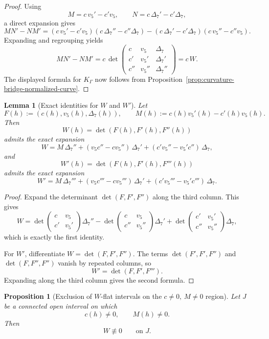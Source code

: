 \documentclass[11pt,a4paper]{amsart}
\theoremstyle{plain}
\newtheorem{proposition}[theorem]{Proposition}
\newtheorem{lemma}[theorem]{Lemma}
\theoremstyle{definition}
\begin{document}
\begin{proof}
Using
\[
M=c\,v_5'-c'v_5,
\qquad
N=c\,\Delta_7'-c'\Delta_7,
\]
a direct expansion gives
\[
M N'-N M'
=
(c\,v_5'-c'v_5)(c\,\Delta_7''-c''\Delta_7)
-
(c\,\Delta_7'-c'\Delta_7)(c\,v_5''-c''v_5).
\]
Expanding and regrouping yields
\[
M N'-N M'
=
c\,
\det\!
\begin{pmatrix}
c & v_5 & \Delta_7\\
c' & v_5' & \Delta_7'\\
c'' & v_5'' & \Delta_7''
\end{pmatrix}
=
c\,W.
\]
The displayed formula for $K_\Gamma$ now follows from
Proposition~\ref{prop:curvature-bridge-normalized-curve}.
\end{proof}

\begin{lemma}[Exact identities for $W$ and $W'$]
\label{lem:exact-W-and-Wprime-identities}
Let
\[
F(h):=(c(h),v_5(h),\Delta_7(h)),
\qquad
M(h):=c(h)v_5'(h)-c'(h)v_5(h).
\]
Then
\[
W(h)=\det(F(h),F'(h),F''(h))
\]
admits the exact expansion
\[
W
=
M\,\Delta_7''
+
(v_5c''-cv_5'')\,\Delta_7'
+
(c'v_5''-v_5'c'')\,\Delta_7,
\]
and
\[
W'(h)=\det(F(h),F'(h),F'''(h))
\]
admits the exact expansion
\[
W'
=
M\,\Delta_7'''
+
(v_5c'''-cv_5''')\,\Delta_7'
+
(c'v_5'''-v_5'c''')\,\Delta_7.
\]
\end{lemma}

\begin{proof}
Expand the determinant $\det(F,F',F'')$ along the third column. This gives
\[
W
=
\det\!\begin{pmatrix}
c & v_5\\ c' & v_5'
\end{pmatrix}\Delta_7''
-
\det\!\begin{pmatrix}
c & v_5\\ c'' & v_5''
\end{pmatrix}\Delta_7'
+
\det\!\begin{pmatrix}
c' & v_5'\\ c'' & v_5''
\end{pmatrix}\Delta_7,
\]
which is exactly the first identity.

For $W'$, differentiate $W=\det(F,F',F'')$. The terms
$\det(F',F',F'')$ and $\det(F,F'',F'')$ vanish by repeated columns, so
\[
W'=\det(F,F',F''').
\]
Expanding along the third column gives the second formula.
\end{proof}

\begin{proposition}[Exclusion of $W$-flat intervals on the $c\neq 0,\ M\neq 0$ region]
\label{prop:no-W-flat-interval}
Let $J$ be a connected open interval on which
\[
c(h)\neq 0,
\qquad
M(h)\neq 0.
\]
Then
\[
W\not\equiv 0
\qquad\text{on }J.
\]
\end{proposition}
\end{document}
